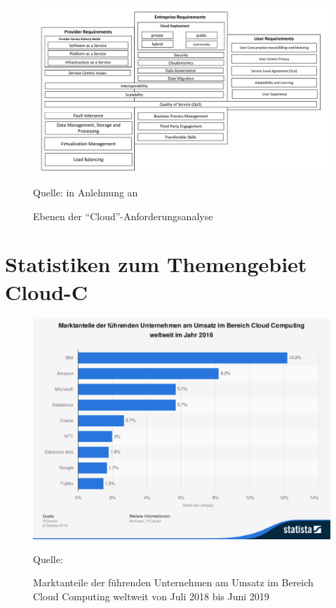 \begin{figure}[H]
	\centering
	\includegraphics[scale=0.45]{img/cloudreq.pdf}
	\caption{Ebenen der \enquote{Cloud}-Anforderungsanalyse}
	{\footnotesize Quelle: in Anlehnung an \cite{rimal_architectural_2011}}
	\label{abb:cloudreq}
\end{figure}

\section{Statistiken zum Themengebiet \ac{Cloud-C}}

\begin{figure}[H]
	\centering
	\includegraphics[scale=0.43]{img/statistic_id150979_marktanteile-der-fuehrenden-unternehmen-im-bereich-cloud-computing-weltweit-2019.pdf}
	\caption{Marktanteile der führenden Unternehmen am Umsatz im Bereich Cloud Computing weltweit von Juli 2018 bis Juni 2019}
	{\footnotesize Quelle: \cite{itcandor_cloud_2019}}
	\label{abb:marktanteileCC19}
\end{figure}

